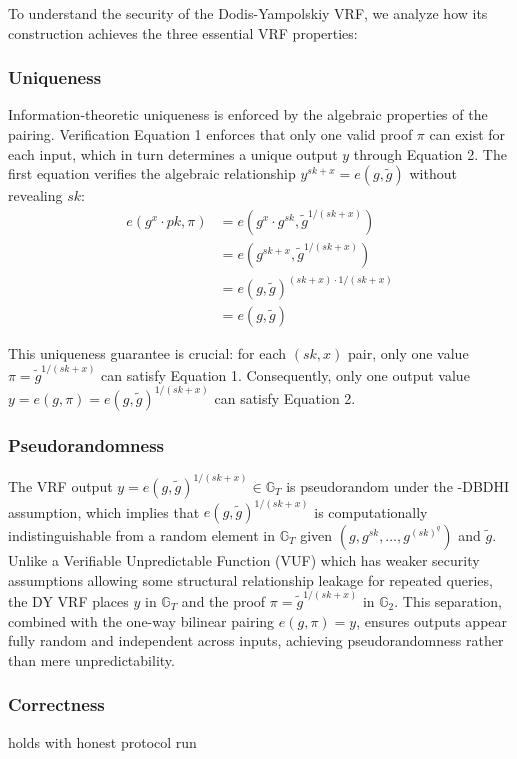 To understand the security of the Dodis-Yampolskiy VRF, we analyze how its construction achieves the three essential VRF properties:

\subsubsection*{Uniqueness}
Information-theoretic uniqueness is enforced by the algebraic properties of the pairing. 
Verification Equation 1 enforces that only one valid proof $\pi$ can exist for each input, which in turn determines a unique output $y$ through Equation 2. The first equation verifies the algebraic relationship $y^{sk+x} = e(g, \tilde{g})$ without revealing $sk$:
\begin{align}
    e(g^{x} \cdot pk, \pi) &= e(g^{x} \cdot g^{sk}, \tilde{g}^{1/(sk + x)}) \\
    &= e(g^{sk + x}, \tilde{g}^{1/(sk + x)}) \\
    &= e(g, \tilde{g})^{(sk + x) \cdot 1/(sk + x)} \\
    &= e(g, \tilde{g})
\end{align}

This uniqueness guarantee is crucial: for each $(sk,x)$ pair, only one value $\pi = \tilde{g}^{1/(sk+x)}$ can satisfy Equation 1. Consequently, only one output value $y = e(g, \pi) = e(g, \tilde{g})^{1/(sk+x)}$ can satisfy Equation 2.


\subsubsection*{Pseudorandomness}
The VRF output $ y = e(g, \tilde{g})^{1/(sk + x)} \in \mathbb{G}_T $ is pseudorandom under the $ $-DBDHI assumption, which implies that $ e(g, \tilde{g})^{1/(sk + x)} $ is computationally indistinguishable from a random element in $ \mathbb{G}_T $ given $ (g, g^{sk}, \ldots, g^{(sk)^q}) $ and $ \tilde{g} $. Unlike a Verifiable Unpredictable Function (VUF) which has weaker security assumptions allowing some structural relationship leakage for repeated queries, the DY VRF places $ y $ in $ \mathbb{G}_T $ and the proof $ \pi = \tilde{g}^{1/(sk + x)} $ in $ \mathbb{G}_2 $. This separation, combined with the one-way bilinear pairing $ e(g, \pi) = y $, ensures outputs appear fully random and independent across inputs, achieving pseudorandomness rather than mere unpredictability.


\subsubsection*{Correctness} holds with honest protocol run





